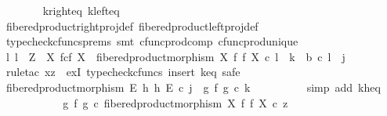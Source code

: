\begin{isabellebody}
\ \ \ \ \ \ \isamarkupfalse%
\ k{\isacharunderscore}{\kern0pt}right{\isacharunderscore}{\kern0pt}eq\ k{\isacharunderscore}{\kern0pt}left{\isacharunderscore}{\kern0pt}eq\isanewline
\ \ \ \ \ \ \isamarkupfalse%
\ fibered{\isacharunderscore}{\kern0pt}product{\isacharunderscore}{\kern0pt}right{\isacharunderscore}{\kern0pt}proj{\isacharunderscore}{\kern0pt}def\ fibered{\isacharunderscore}{\kern0pt}product{\isacharunderscore}{\kern0pt}left{\isacharunderscore}{\kern0pt}proj{\isacharunderscore}{\kern0pt}def\isanewline
\ \ \ \ \ \ \isamarkupfalse%
\ {\isacharparenleft}{\kern0pt}typecheck{\isacharunderscore}{\kern0pt}cfuncs{\isacharunderscore}{\kern0pt}prems{\isacharcomma}{\kern0pt}\ smt\ cfunc{\isacharunderscore}{\kern0pt}prod{\isacharunderscore}{\kern0pt}comp\ cfunc{\isacharunderscore}{\kern0pt}prod{\isacharunderscore}{\kern0pt}unique{\isacharparenright}{\kern0pt}\isanewline
\isanewline
\ \ \ \ \isamarkupfalse%
\ {\isachardoublequoteopen}{\isasymexists}l{\isachardot}{\kern0pt}\ l\ {\isacharcolon}{\kern0pt}\ Z\ {\isasymrightarrow}\ X\ \isactrlbsub f\isactrlesub {\isasymtimes}\isactrlsub c\isactrlbsub f\isactrlesub \ X\ {\isasymand}\ fibered{\isacharunderscore}{\kern0pt}product{\isacharunderscore}{\kern0pt}morphism\ X\ f\ f\ X\ {\isasymcirc}\isactrlsub c\ l\ {\isacharequal}{\kern0pt}\ k\ {\isasymand}\ b\ {\isasymcirc}\isactrlsub c\ l\ {\isacharequal}{\kern0pt}\ j{\isachardoublequoteclose}\isanewline
\ \ \ \ \isamarkupfalse%
\ {\isacharparenleft}{\kern0pt}rule{\isacharunderscore}{\kern0pt}tac\ x{\isacharequal}{\kern0pt}z\ \ exI{\isacharcomma}{\kern0pt}\ typecheck{\isacharunderscore}{\kern0pt}cfuncs{\isacharcomma}{\kern0pt}\ insert\ k{\isacharunderscore}{\kern0pt}eq{\isacharcomma}{\kern0pt}\ safe{\isacharparenright}{\kern0pt}\isanewline
\ \ \ \ \ \ \isamarkupfalse%
\ {\isachardoublequoteopen}fibered{\isacharunderscore}{\kern0pt}product{\isacharunderscore}{\kern0pt}morphism\ E\ h\ h\ E\ {\isasymcirc}\isactrlsub c\ j\ {\isacharequal}{\kern0pt}\ {\isacharparenleft}{\kern0pt}g\ {\isasymtimes}\isactrlsub f\ g{\isacharparenright}{\kern0pt}\ {\isasymcirc}\isactrlsub c\ k{\isachardoublequoteclose}\isanewline
\ \ \ \ \ \ \ \ \isamarkupfalse%
\ {\isacharparenleft}{\kern0pt}simp\ add{\isacharcolon}{\kern0pt}\ k{\isacharunderscore}{\kern0pt}h{\isacharunderscore}{\kern0pt}eq{\isacharparenright}{\kern0pt}\isanewline
\ \ \ \ \ \ \isamarkupfalse%
\ \isamarkupfalse%
\ {\isachardoublequoteopen}{\isachardot}{\kern0pt}{\isachardot}{\kern0pt}{\isachardot}{\kern0pt}\ {\isacharequal}{\kern0pt}\ {\isacharparenleft}{\kern0pt}g\ {\isasymtimes}\isactrlsub f\ g{\isacharparenright}{\kern0pt}\ {\isasymcirc}\isactrlsub c\ fibered{\isacharunderscore}{\kern0pt}product{\isacharunderscore}{\kern0pt}morphism\ X\ f\ f\ X\ {\isasymcirc}\isactrlsub c\ z{\isachardoublequoteclose}\isanewline

\end{isabellebody}
